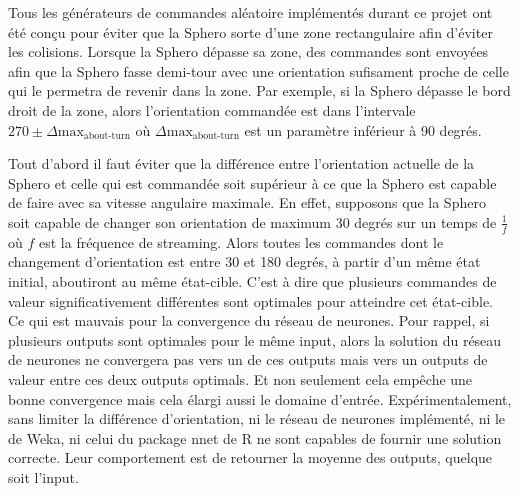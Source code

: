 Tous les générateurs de commandes aléatoire implémentés durant ce projet ont été conçu pour éviter que la Sphero sorte d'une zone rectangulaire afin d'éviter les colisions.
Lorsque la Sphero dépasse sa zone, des commandes sont envoyées afin que la Sphero fasse demi-tour avec une orientation sufisament proche de celle qui le permetra de revenir dans la zone.
Par exemple, si la Sphero dépasse le bord droit de la zone,
alors l'orientation commandée est dans l'intervale $270 \pm \Delta\text{max}_{\text{about-turn}}$ où $\Delta\text{max}_{\text{about-turn}}$ est un paramètre inférieur à 90 degrés.

Tout d'abord il faut éviter que la différence entre l'orientation actuelle de la Sphero et celle qui est commandée soit supérieur à ce que la Sphero est capable de faire avec sa vitesse angulaire maximale.
En effet, supposons que la Sphero soit capable de changer son orientation de maximum 30 degrés sur un temps de $\frac{1}{f}$ où $f$ est la fréquence de streaming.
Alors toutes les commandes dont le changement d'orientation est entre 30 et 180 degrés, à partir d'un même état initial, aboutiront au même état-cible.
C'est à dire que plusieurs commandes de valeur significativement différentes sont optimales pour atteindre cet état-cible.
Ce qui est mauvais pour la convergence du réseau de neurones.
Pour rappel, si plusieurs outputs sont optimales pour le même input, alors la solution du réseau de neurones ne convergera pas vers un de ces outputs mais vers un outputs de valeur entre ces deux outputs optimals.
Et non seulement cela empêche une bonne convergence mais cela élargi aussi le domaine d'entrée.
Expérimentalement, sans limiter la différence d'orientation, ni le réseau de neurones implémenté, ni le \mlp de Weka, ni celui du package nnet de R ne sont capables de fournir une solution correcte.
Leur comportement est de retourner la moyenne des outputs, quelque soit l'input.\\


